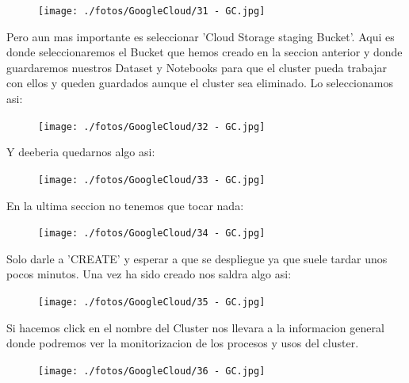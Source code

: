 \documentclass[a4paper,10pt]{article}
\begin{document}
\begin{figure}[H]
\begin{center}
\texttt{[image: ./fotos/GoogleCloud/31 - GC.jpg]}
\end{center}
\end{figure} 

Pero aun mas importante es seleccionar 'Cloud Storage staging Bucket'. Aqui es donde seleccionaremos el Bucket que hemos creado en la seccion anterior y donde guardaremos nuestros Dataset y Notebooks para que el cluster pueda trabajar con ellos y queden guardados aunque el cluster sea eliminado. Lo seleccionamos asi:

\begin{figure}[H]
\begin{center}
\texttt{[image: ./fotos/GoogleCloud/32 - GC.jpg]}
\end{center}
\end{figure}

Y deeberia quedarnos algo asi:

\begin{figure}[H]
\begin{center}
\texttt{[image: ./fotos/GoogleCloud/33 - GC.jpg]}
\end{center}
\end{figure}

En la ultima seccion no tenemos que tocar nada:

\begin{figure}[H]
\begin{center}
\texttt{[image: ./fotos/GoogleCloud/34 - GC.jpg]}
\end{center}
\end{figure}

Solo darle a 'CREATE' y esperar a que se despliegue ya que suele tardar unos pocos minutos. Una vez ha sido creado nos saldra algo asi:

\begin{figure}[H]
\begin{center}
\texttt{[image: ./fotos/GoogleCloud/35 - GC.jpg]}
\end{center}
\end{figure}

Si hacemos click en el nombre del Cluster nos llevara a la informacion general donde podremos ver la monitorizacion de los procesos y usos del cluster.

\begin{figure}[H]
\begin{center}
\texttt{[image: ./fotos/GoogleCloud/36 - GC.jpg]}
\end{center}
\end{figure}
\end{document}
